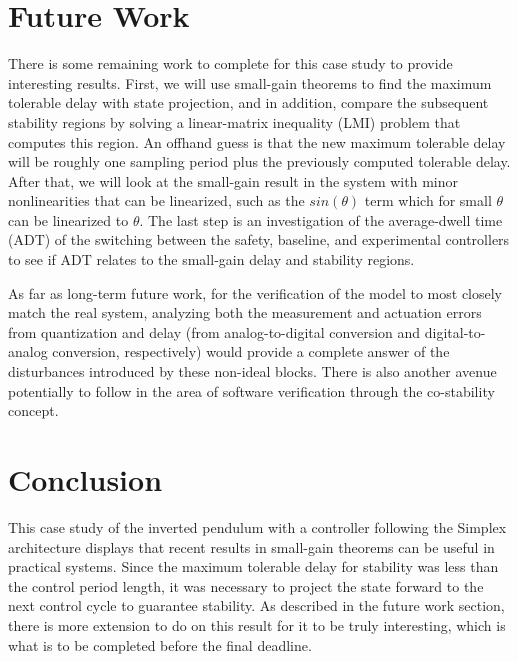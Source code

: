 \documentclass[conference]{IEEEtran}
\begin{document}
\section{Future Work}
There is some remaining work to complete for this case study to provide interesting results.  First, we will use small-gain theorems to find the maximum tolerable delay with state projection, and in addition, compare the subsequent stability regions by solving a linear-matrix inequality (LMI) problem that computes this region.  An offhand guess is that the new maximum tolerable delay will be roughly one sampling period plus the previously computed tolerable delay.  After that, we will look at the small-gain result in the system with minor nonlinearities that can be linearized, such as the $sin(\theta)$ term which for small $\theta$ can be linearized to $\theta$.  The last step is an investigation of the average-dwell time (ADT) of the switching between the safety, baseline, and experimental controllers to see if ADT relates to the small-gain delay and stability regions.

As far as long-term future work, for the verification of the model to most closely match the real system, analyzing both the measurement and actuation errors from quantization and delay (from analog-to-digital conversion and digital-to-analog conversion, respectively) would provide a complete answer of the disturbances introduced by these non-ideal blocks.  There is also another avenue potentially to follow in the area of software verification through the co-stability concept.

\section{Conclusion}
This case study of the inverted pendulum with a controller following the Simplex architecture displays that recent results in small-gain theorems can be useful in practical systems.  Since the maximum tolerable delay for stability was less than the control period length, it was necessary to project the state forward to the next control cycle to guarantee stability.  As described in the future work section, there is more extension to do on this result for it to be truly interesting, which is what is to be completed before the final deadline.





\end{document}

